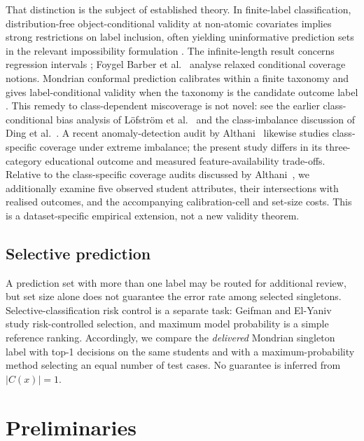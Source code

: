 That distinction is the subject of established theory. In finite-label
classification, distribution-free object-conditional validity at non-atomic
covariates implies strong restrictions on label inclusion, often yielding
uninformative prediction sets in the relevant impossibility formulation \cite{vovk2012}. The infinite-length result concerns
regression intervals \cite{leiwasserman2014}; Foygel Barber et
al.~\cite{barber2021} analyse relaxed conditional coverage notions.
Mondrian conformal prediction calibrates within a finite taxonomy and gives
label-conditional validity when the taxonomy is the candidate outcome label
\cite{vovk2003mondrian}. This remedy to class-dependent miscoverage is not
novel: see the earlier class-conditional bias analysis of
L\"ofstr\"om et al.~\cite{lofstrom2015} and the class-imbalance discussion of
Ding et al.~\cite{ding2023}. A recent anomaly-detection audit by
Althani~\cite{althani2026} likewise studies class-specific coverage
under extreme imbalance; the present study differs in its three-category
educational outcome and measured feature-availability trade-offs.
Relative to the class-specific coverage audits discussed by Althani~\cite{althani2026},
we additionally examine five observed student attributes, their intersections
with realised outcomes, and the accompanying calibration-cell and set-size costs.
This is a dataset-specific empirical extension, not a new validity theorem.



\subsection{Selective prediction}

A prediction set with more than one label may be routed for additional
review, but set size alone does not guarantee the error rate among selected
singletons. Selective-classification risk control is a separate task:
Geifman and El-Yaniv~\cite{geifman2017,geifman2019} study risk-controlled
selection, and maximum model probability is a simple reference ranking.
Accordingly, we compare the \emph{delivered} Mondrian singleton label with
top-1 decisions on the same students and with a maximum-probability method
selecting an equal number of test cases. No guarantee is inferred from
$|C(x)|=1$.

\section{Preliminaries}\label{sec:prelim}

